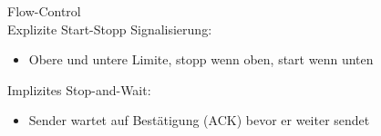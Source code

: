 \begin{concept}{Flow-Control}\\
    Explizite Start-Stopp Signalisierung:
    \begin{itemize}
        \item Obere und untere Limite, stopp wenn oben, start wenn unten
    \end{itemize}
    Implizites Stop-and-Wait:
    \begin{itemize}
        \item Sender wartet auf Bestätigung (ACK) bevor er weiter sendet
    \end{itemize}
\end{concept}
